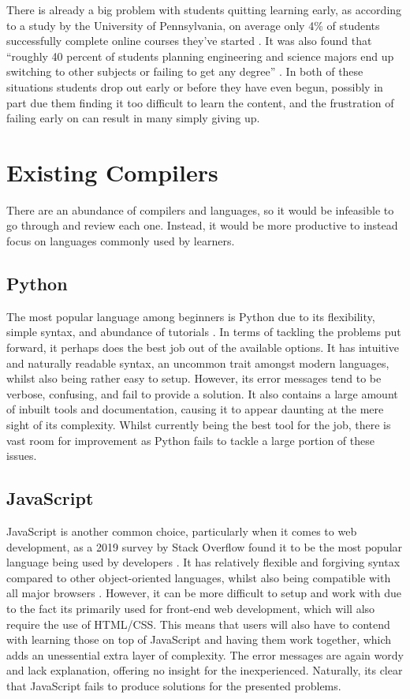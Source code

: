 \documentclass[
]{report}
\begin{document}
There is already a big problem with students quitting learning early, as
according to a study by the University of Pennsylvania, on average only
4\% of students successfully complete online courses they've started
\cite{upenn-report}. It was also found that ``roughly 40 percent of students
planning engineering and science majors end up switching to other
subjects or failing to get any degree'' \cite{nytimes-article}. In both of these
situations students drop out early or before they have even begun,
possibly in part due them finding it too difficult to learn the
content, and the frustration of failing early on can result in many
simply giving up.

\section{Existing Compilers}
There are an abundance of compilers and languages, so it would be
infeasible to go through and review each one. Instead, it would be more
productive to instead focus on languages commonly used by learners.

\subsection{Python}
The most popular language among beginners is Python due to its
flexibility, simple syntax, and abundance of tutorials \cite{simplilearn-article}. In
terms of tackling the problems put forward, it perhaps does the best job
out of the available options. It has intuitive and naturally readable
syntax, an uncommon trait amongst modern languages, whilst also being
rather easy to setup. However, its error messages tend to be verbose,
confusing, and fail to provide a solution. It also contains a large
amount of inbuilt tools and documentation, causing it to appear daunting
at the mere sight of its complexity. Whilst currently being the best
tool for the job, there is vast room for improvement as Python fails to
tackle a large portion of these issues.

\subsection{JavaScript}
JavaScript is another common choice, particularly when it comes to web
development, as a 2019 survey by Stack Overflow found it to be the most
popular language being used by developers \cite{survey-stackoverflow}. It has relatively
flexible and forgiving syntax compared to other object-oriented
languages, whilst also being compatible with all major browsers
\cite{fullstack-article}. However, it can be more difficult to setup and work with due
to the fact its primarily used for front-end web development, which will
also require the use of HTML/CSS. This means that users will also have
to contend with learning those on top of JavaScript and having them work
together, which adds an unessential extra layer of complexity. The error
messages are again wordy and lack explanation, offering no insight for
the inexperienced. Naturally, its clear that JavaScript fails to produce
solutions for the presented problems.
\end{document}
